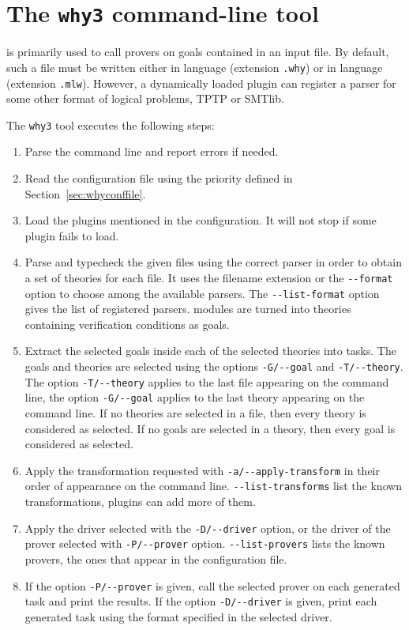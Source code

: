 \section{The \texttt{why3} command-line tool}
\label{sec:why3ref}

\why is primarily used to call provers on goals contained in an
input file. By default, such a file must be written either in \why language
(extension \texttt{.why}) or in \whyml language (extension \texttt{.mlw}).
However, a dynamically loaded
plugin can register a parser for some other format of logical problems,
\eg{} TPTP or SMTlib.

The \texttt{why3} tool executes the following steps:
\begin{enumerate}
\item Parse the command line and report errors if needed.
\item Read the configuration file using the priority defined in
  Section~\ref{sec:whyconffile}.
\item Load the plugins mentioned in the configuration. It will not
  stop if some plugin fails to load.
\item Parse and typecheck the given files using the correct parser in order
  to obtain a set of \why theories for each file. It uses
  the filename extension or the \verb|--format| option to choose
  among the available parsers. The \verb|--list-format| option gives
  the list of registered parsers.
  \whyml modules are turned into
  theories containing verification conditions as goals.
\item Extract the selected goals inside each of the selected theories
  into tasks. The goals and theories are selected using the options
  \verb|-G/--goal| and \verb|-T/--theory|. The option
  \verb|-T/--theory| applies to the last file appearing on the
  command line, the option \verb|-G/--goal| applies to the last theory
  appearing on the command line. If no theories are selected in a file,
  then every theory is considered as selected. If no goals are selected
  in a theory, then every goal is considered as selected.
\item Apply the transformation requested
  with \verb|-a/--apply-transform| in their order of appearance on the
  command line. \verb|--list-transforms| list the known
  transformations, plugins can add more of them.
\item Apply the driver selected with the \verb|-D/--driver| option,
  or the driver of the prover selected with \verb|-P/--prover|
  option. \verb|--list-provers| lists the known provers, \ie the ones
  that appear in the configuration file.
\item If the option \verb|-P/--prover| is given, call the selected prover
  on each generated task and print the results. If the option
  \verb|-D/--driver| is given, print each generated task using
  the format specified in the selected driver.
\end{enumerate}

